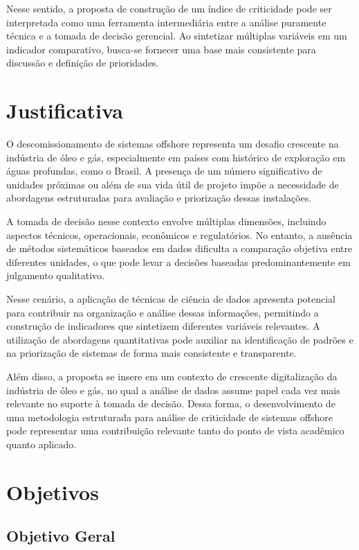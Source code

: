 \documentclass[a4paper,12pt]{article}
\begin{document}
Nesse sentido, a proposta de construção de um índice de criticidade pode ser interpretada como uma ferramenta intermediária entre a análise puramente técnica e a tomada de decisão gerencial. Ao sintetizar múltiplas variáveis em um indicador comparativo, busca-se fornecer uma base mais consistente para discussão e definição de prioridades.

\section*{Justificativa}

O descomissionamento de sistemas offshore representa um desafio crescente na indústria de óleo e gás, especialmente em países com histórico de exploração em águas profundas, como o Brasil. A presença de um número significativo de unidades próximas ou além de sua vida útil de projeto impõe a necessidade de abordagens estruturadas para avaliação e priorização dessas instalações.

A tomada de decisão nesse contexto envolve múltiplas dimensões, incluindo aspectos técnicos, operacionais, econômicos e regulatórios. No entanto, a ausência de métodos sistemáticos baseados em dados dificulta a comparação objetiva entre diferentes unidades, o que pode levar a decisões baseadas predominantemente em julgamento qualitativo.

Nesse cenário, a aplicação de técnicas de ciência de dados apresenta potencial para contribuir na organização e análise dessas informações, permitindo a construção de indicadores que sintetizem diferentes variáveis relevantes. A utilização de abordagens quantitativas pode auxiliar na identificação de padrões e na priorização de sistemas de forma mais consistente e transparente.

Além disso, a proposta se insere em um contexto de crescente digitalização da indústria de óleo e gás, no qual a análise de dados assume papel cada vez mais relevante no suporte à tomada de decisão. Dessa forma, o desenvolvimento de uma metodologia estruturada para análise de criticidade de sistemas offshore pode representar uma contribuição relevante tanto do ponto de vista acadêmico quanto aplicado.

\section{Objetivos}

\subsection*{Objetivo Geral}
\end{document}
